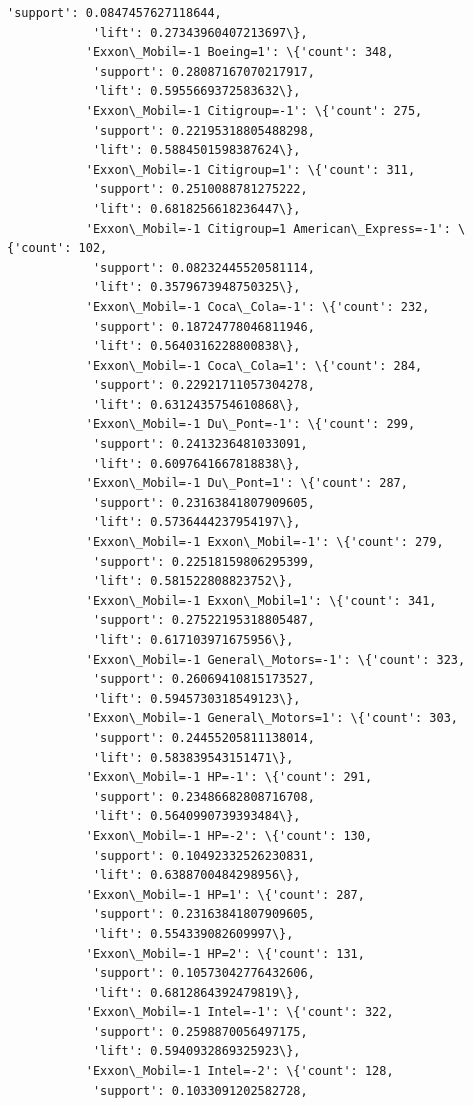 \documentclass[11pt]{article}
\begin{document}
\begin{Verbatim}[commandchars=\\\{\}]
            'support': 0.0847457627118644,
            'lift': 0.27343960407213697\},
           'Exxon\_Mobil=-1 Boeing=1': \{'count': 348,
            'support': 0.28087167070217917,
            'lift': 0.5955669372583632\},
           'Exxon\_Mobil=-1 Citigroup=-1': \{'count': 275,
            'support': 0.22195318805488298,
            'lift': 0.5884501598387624\},
           'Exxon\_Mobil=-1 Citigroup=1': \{'count': 311,
            'support': 0.2510088781275222,
            'lift': 0.6818256618236447\},
           'Exxon\_Mobil=-1 Citigroup=1 American\_Express=-1': \{'count': 102,
            'support': 0.08232445520581114,
            'lift': 0.3579673948750325\},
           'Exxon\_Mobil=-1 Coca\_Cola=-1': \{'count': 232,
            'support': 0.18724778046811946,
            'lift': 0.5640316228800838\},
           'Exxon\_Mobil=-1 Coca\_Cola=1': \{'count': 284,
            'support': 0.22921711057304278,
            'lift': 0.6312435754610868\},
           'Exxon\_Mobil=-1 Du\_Pont=-1': \{'count': 299,
            'support': 0.2413236481033091,
            'lift': 0.6097641667818838\},
           'Exxon\_Mobil=-1 Du\_Pont=1': \{'count': 287,
            'support': 0.23163841807909605,
            'lift': 0.5736444237954197\},
           'Exxon\_Mobil=-1 Exxon\_Mobil=-1': \{'count': 279,
            'support': 0.22518159806295399,
            'lift': 0.581522808823752\},
           'Exxon\_Mobil=-1 Exxon\_Mobil=1': \{'count': 341,
            'support': 0.27522195318805487,
            'lift': 0.617103971675956\},
           'Exxon\_Mobil=-1 General\_Motors=-1': \{'count': 323,
            'support': 0.26069410815173527,
            'lift': 0.5945730318549123\},
           'Exxon\_Mobil=-1 General\_Motors=1': \{'count': 303,
            'support': 0.24455205811138014,
            'lift': 0.583839543151471\},
           'Exxon\_Mobil=-1 HP=-1': \{'count': 291,
            'support': 0.23486682808716708,
            'lift': 0.5640990739393484\},
           'Exxon\_Mobil=-1 HP=-2': \{'count': 130,
            'support': 0.10492332526230831,
            'lift': 0.6388700484298956\},
           'Exxon\_Mobil=-1 HP=1': \{'count': 287,
            'support': 0.23163841807909605,
            'lift': 0.554339082609997\},
           'Exxon\_Mobil=-1 HP=2': \{'count': 131,
            'support': 0.10573042776432606,
            'lift': 0.6812864392479819\},
           'Exxon\_Mobil=-1 Intel=-1': \{'count': 322,
            'support': 0.2598870056497175,
            'lift': 0.5940932869325923\},
           'Exxon\_Mobil=-1 Intel=-2': \{'count': 128,
            'support': 0.1033091202582728,

\end{Verbatim}
\end{document}
